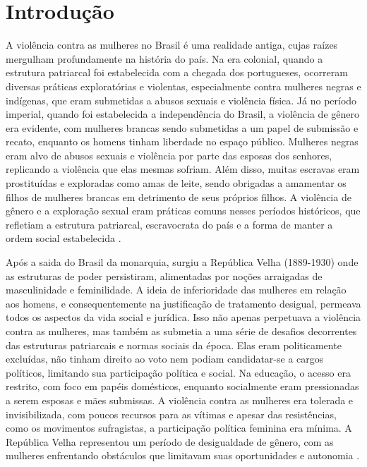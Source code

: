 \documentclass[
    article,			%
    12pt,				%
    oneside,            %
    a4paper,			%
    english,			%
    brazil,				%
    ]{abntex2}
\begin{document}
\section{Introdução}
\pagestyle{plain}
    A violência contra as mulheres no Brasil é uma realidade antiga, cujas raízes mergulham profundamente na história do país. Na era colonial, quando a estrutura patriarcal foi estabelecida com a chegada dos portugueses, ocorreram diversas práticas exploratórias e violentas, especialmente contra mulheres negras e indígenas, que eram submetidas a abusos sexuais e violência física. Já no período imperial, quando foi estabelecida a independência do Brasil, a violência de gênero era evidente, com mulheres brancas sendo submetidas a um papel de submissão e recato, enquanto os homens tinham liberdade no espaço público. Mulheres negras eram alvo de abusos sexuais e violência por parte das esposas dos senhores, replicando a violência que elas mesmas sofriam. Além disso, muitas escravas eram prostituídas e exploradas como amas de leite, sendo obrigadas a amamentar os filhos de mulheres brancas em detrimento de seus próprios filhos. A violência de gênero e a exploração sexual eram práticas comuns nesses períodos históricos, que refletiam a estrutura patriarcal, escravocrata do país e a forma de manter a ordem social estabelecida \cite{colonialImpep_2019}.

    Após a saida do Brasil da monarquia, surgiu a República Velha (1889-1930) onde as estruturas de poder persistiram, alimentadas por noções arraigadas de masculinidade e feminilidade. A ideia de inferioridade das mulheres em relação aos homens, e consequentemente na justificação de tratamento desigual, permeava todos os aspectos da vida social e jurídica. Isso não apenas perpetuava a violência contra as mulheres, mas também as submetia a uma série de desafios decorrentes das estruturas patriarcais e normas sociais da época. Elas eram politicamente excluídas, não tinham direito ao voto nem podiam candidatar-se a cargos políticos, limitando sua participação política e social. Na educação, o acesso era restrito, com foco em papéis domésticos, enquanto socialmente eram pressionadas a serem esposas e mães submissas. A violência contra as mulheres era tolerada e invisibilizada, com poucos recursos para as vítimas e apesar das resistências, como os movimentos sufragistas, a participação política feminina era mínima. A República Velha representou um período de desigualdade de gênero, com as mulheres enfrentando obstáculos que limitavam suas oportunidades e autonomia \cite{repvelha_2018}.
\end{document}
